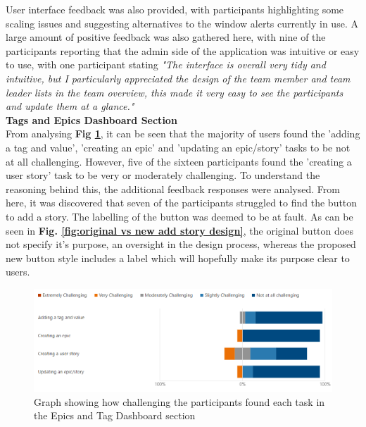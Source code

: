 \documentclass[l4proj.tex]{subfiles}
\begin{document}
User interface feedback was also provided, with participants highlighting some scaling issues and suggesting alternatives to the window alerts currently in use. A large amount of positive feedback was also gathered here, with nine of the participants reporting that the admin side of the application was intuitive or easy to use, with one participant stating \textit{"The interface is overall very tidy and intuitive, but I particularly appreciated the design of the team member and team leader lists in the team overview, this made it very easy to see the participants and update them at a glance."}
\\
\textbf{Tags and Epics Dashboard Section}\\
From analysing \textbf{Fig \ref{fig:epic and tag form feedback}}, it can be seen that the majority of users found the 'adding a tag and value', 'creating an epic' and 'updating an epic/story' tasks to be not at all challenging. However, five of the sixteen participants found the 'creating a user story' task to be very or moderately challenging. To understand the reasoning behind this, the additional feedback responses were analysed. From here, it was discovered that seven of the participants struggled to find the button to add a story. The labelling of the button was deemed to be at fault. As can be seen in \textbf{Fig. \ref{fig:original vs new add story design}}, the original button does not specify it's purpose, an oversight in the design process, whereas the proposed new button style includes a label which will hopefully make its purpose clear to users. 

\begin{figure}[h!]
\begin{center}
\includegraphics[scale=0.5]{dissertation/images/EvaluationEpicsAndTagsChallengingGraph.png}
\caption{Graph showing how challenging the participants found each task in the Epics and Tag Dashboard section}
\label{fig:epic and tag form feedback} 
\end{center}
\end{figure}
\end{document}
